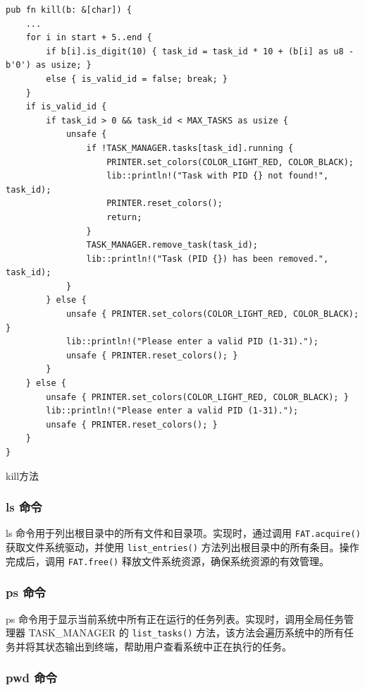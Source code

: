 \begin{listing}[htbp]
    \begin{verbatim}
pub fn kill(b: &[char]) {
    ...
    for i in start + 5..end {
        if b[i].is_digit(10) { task_id = task_id * 10 + (b[i] as u8 - b'0') as usize; }
        else { is_valid_id = false; break; }
    }
    if is_valid_id {
        if task_id > 0 && task_id < MAX_TASKS as usize {
            unsafe {
                if !TASK_MANAGER.tasks[task_id].running {
                    PRINTER.set_colors(COLOR_LIGHT_RED, COLOR_BLACK);
                    lib::println!("Task with PID {} not found!", task_id);
                    PRINTER.reset_colors();
                    return;
                }
                TASK_MANAGER.remove_task(task_id);
                lib::println!("Task (PID {}) has been removed.", task_id);
            }
        } else {
            unsafe { PRINTER.set_colors(COLOR_LIGHT_RED, COLOR_BLACK); }
            lib::println!("Please enter a valid PID (1-31).");
            unsafe { PRINTER.reset_colors(); }
        }
    } else {
        unsafe { PRINTER.set_colors(COLOR_LIGHT_RED, COLOR_BLACK); }
        lib::println!("Please enter a valid PID (1-31).");
        unsafe { PRINTER.reset_colors(); }
    }
}
    \end{verbatim}
    \caption{kill方法}\label{lst:KillMethod}
\end{listing}

\subsubsection{ls 命令}

ls 命令用于列出根目录中的所有文件和目录项。实现时，通过调用 \texttt{FAT.acquire()} 获取文件系统驱动，并使用 \texttt{list\_entries()} 方法列出根目录中的所有条目。操作完成后，调用 \texttt{FAT.free()} 释放文件系统资源，确保系统资源的有效管理。

\subsubsection{ps 命令}

ps 命令用于显示当前系统中所有正在运行的任务列表。实现时，调用全局任务管理器 TASK\_MANAGER 的 \texttt{list\_tasks()} 方法，该方法会遍历系统中的所有任务并将其状态输出到终端，帮助用户查看系统中正在执行的任务。

\subsubsection{pwd 命令}

